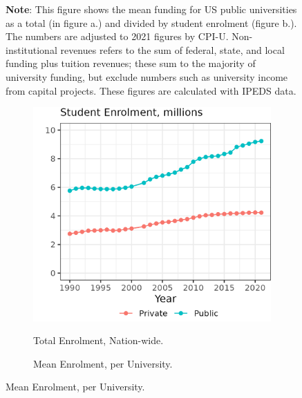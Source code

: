 \begin{figure}[H]
\begin{subfigure}[b]{0.495\textwidth}
        \label{fig:mean-funding-fte}
    \end{subfigure}
    \label{fig:funding}
    \vspace{-1cm}
    \justify
    \footnotesize
    \textbf{Note}:
    This figure shows the mean funding for US public universities as a total (in figure a.) and divided by student enrolment (figure b.).
    The numbers are adjusted to 2021 figures by CPI-U.
    Non-institutional revenues refers to the sum of federal, state, and local funding plus tuition revenues; these sum to the majority of university funding, but exclude numbers such as university income from capital projects.
    These figures are calculated with IPEDS data.
\end{figure}

\begin{figure}[H]
    \centering
    \singlespacing
    \caption{Total Student Enrolment, by University Sector and Year.}
    \begin{subfigure}[b]{0.495\textwidth}
        \centering
        \caption{Total Enrolment, Nation-wide.}
        \includegraphics[width=\textwidth]{figures/enrollment-total.png}
        \label{fig:enrollment-total}
    \end{subfigure}
    \begin{subfigure}[b]{0.495\textwidth}
        \centering
        \caption{Mean Enrolment, per University.}

\end{subfigure}
\end{figure}
